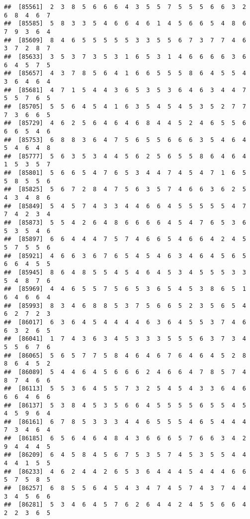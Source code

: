 \documentclass[
]{book}
\begin{document}
\begin{verbatim}
##  [85561]  2  3  8  5  6  6  6  4  3  5  5  7  5  5  5  6  6  3  2  6  8  4  6  7
##  [85585]  5  8  3  3  5  4  6  6  4  6  1  4  5  6  6  5  4  8  6  7  9  3  6  4
##  [85609]  8  4  6  5  5  5  5  5  3  3  5  5  6  7  3  7  7  4  6  3  7  2  8  7
##  [85633]  3  5  3  7  3  5  3  1  6  5  3  1  4  6  6  6  6  3  6  6  4  5  7  5
##  [85657]  4  3  7  8  5  6  4  1  6  6  5  5  5  8  6  4  5  5  4  3  6  4  6  4
##  [85681]  4  7  1  5  4  4  3  6  5  3  5  3  6  4  6  3  4  4  7  5  5  7  6  5
##  [85705]  5  5  6  4  5  4  1  6  3  5  4  5  4  5  3  5  2  7  7  7  3  6  6  5
##  [85729]  4  6  2  5  6  4  6  4  6  8  4  4  5  2  4  6  5  5  6  6  6  5  4  6
##  [85753]  6  8  8  3  6  4  7  5  6  5  5  6  6  6  3  5  4  6  4  5  4  6  4  8
##  [85777]  5  6  3  5  3  4  4  5  6  2  5  6  5  5  8  6  4  6  4  1  5  3  5  7
##  [85801]  5  6  6  5  4  7  6  5  3  4  4  7  4  5  4  7  1  6  5  5  8  5  5  6
##  [85825]  5  6  7  2  8  4  7  5  6  3  5  7  4  6  6  3  6  2  5  4  3  4  8  6
##  [85849]  5  4  5  7  4  3  3  4  4  6  6  4  5  5  5  5  5  4  7  7  4  2  3  4
##  [85873]  5  5  4  2  6  4  8  6  6  6  6  4  5  4  7  6  5  3  6  5  3  5  4  6
##  [85897]  6  6  4  4  4  7  5  7  4  6  6  5  4  6  6  4  2  4  5  5  7  5  5  6
##  [85921]  4  6  6  3  6  7  6  5  4  5  4  6  3  4  6  4  5  6  5  6  6  4  5  5
##  [85945]  8  6  4  8  5  5  4  5  4  6  4  5  3  4  5  5  5  3  3  5  4  8  7  6
##  [85969]  4  4  6  5  5  7  5  6  5  3  6  5  4  5  3  8  6  5  1  6  4  6  6  4
##  [85993]  8  3  4  6  8  8  5  3  7  5  6  6  5  2  3  5  6  5  4  6  2  7  2  3
##  [86017]  6  3  6  4  5  4  4  4  4  6  3  6  4  5  5  3  7  4  6  6  3  2  6  5
##  [86041]  1  7  4  3  6  3  4  5  3  3  3  5  5  5  6  3  7  3  4  5  5  6  7  6
##  [86065]  5  6  5  7  7  5  8  4  6  4  6  7  6  4  6  4  5  2  8  8  6  4  5  2
##  [86089]  5  4  4  6  4  5  6  6  6  2  4  6  6  4  7  8  5  7  4  8  7  4  6  6
##  [86113]  5  5  3  6  4  5  5  7  3  2  5  4  5  4  3  3  6  4  6  6  6  4  6  6
##  [86137]  5  3  8  4  5  3  5  6  6  4  5  5  5  5  6  5  5  4  5  4  5  9  6  4
##  [86161]  6  7  8  5  3  3  3  4  4  6  5  5  5  4  6  5  4  4  4  7  3  4  6  4
##  [86185]  6  5  6  4  6  4  8  4  3  6  6  6  5  7  6  6  3  4  2  9  4  4  4  5
##  [86209]  6  4  5  8  4  5  6  7  5  3  5  7  4  5  3  5  5  4  4  4  4  1  5  5
##  [86233]  4  6  2  4  4  2  6  5  3  6  4  4  4  5  4  4  4  6  6  5  7  5  8  5
##  [86257]  6  8  5  5  6  4  5  4  3  4  7  4  5  7  4  3  7  4  4  3  4  5  6  6
##  [86281]  5  3  4  6  4  5  7  6  2  6  4  4  2  4  5  5  6  6  4  2  2  3  6  5

\end{verbatim}
\end{document}
